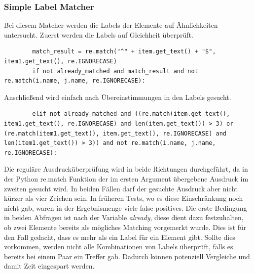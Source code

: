 		\subsubsection{Simple Label Matcher}
		Bei diesem Matcher werden die Labels der Elemente auf Ähnlichkeiten
		untersucht.
		Zuerst werden die Labels auf Gleichheit überprüft.
		\begin{lstlisting}
		match_result = re.match("^" + item.get_text() + "$", item1.get_text(), re.IGNORECASE)
		if not already_matched and match_result and not re.match(i.name, j.name, re.IGNORECASE):
		\end{lstlisting}
		Anschließend wird einfach nach Übereinstimmungen in den Labels gesucht.
		\begin{lstlisting}
		elif not already_matched and ((re.match(item.get_text(), item1.get_text(), re.IGNORECASE) and len(item.get_text()) > 3) or (re.match(item1.get_text(), item.get_text(), re.IGNORECASE) and len(item1.get_text()) > 3)) and not re.match(i.name, j.name, re.IGNORECASE):
		\end{lstlisting}
		Die reguläre Ausdrucküberprüfung wird in beide Richtungen durchgeführt, da in
		der Python re.match Funktion der im ersten Argument übergebene Ausdruck im
		zweiten gesucht wird. In beiden Fällen darf der gesuchte Ausdruck aber nicht
		kürzer als vier Zeichen sein. In früheren Tests, wo es diese Einschränkung
		noch nicht gab, waren in der Ergebnismenge viele false positives.
		Die erste Bedingung in beiden Abfragen ist nach der Variable
		\textit{already\textunderscorematched}, diese dient dazu festzuhalten, ob zwei Elemente
		bereits als mögliches Matching vorgemerkt wurde. Dies ist für den Fall
		gedacht, dass es mehr als ein Label für ein Element gibt. Sollte dies
		vorkommen, werden nicht alle Kombinationen von Labels überprüft, falls es
		bereits bei einem Paar ein Treffer gab. Dadurch können potenziell Vergleiche
		und damit Zeit eingespart werden.
		
